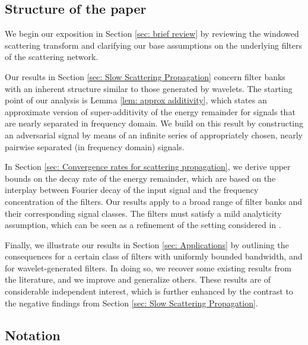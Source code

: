 \documentclass[11pt]{amsart}
\newenvironment{proof sketch} {\textit{Proof sketch.}}{}
\begin{document}
  
  \subsection{Structure of the paper}
  
  We begin our exposition in Section \ref{sec: brief review} by reviewing the windowed scattering transform and clarifying our base assumptions on the underlying filters of the scattering network. 
  
  Our results in Section \ref{sec: Slow Scattering Propagation} concern filter banks with an inherent structure similar to those generated by wavelets. The starting point of our analysis is Lemma \ref{lem: approx additivity}, which states an approximate version of super-additivity of the energy remainder for signals that are nearly separated in frequency domain. We build on this result by constructing an adversarial signal by means of an infinite series of appropriately chosen, nearly pairwise separated (in frequency domain) signals.
  
  In Section \ref{sec: Convergence rates for scattering propagation}, we derive upper bounds on the decay rate of the energy remainder, which are based on the interplay between Fourier decay of the input signal and the frequency concentration of the filters. Our results apply to a broad range of filter banks and their corresponding signal classes. The filters must satisfy a mild analyticity assumption, which can be seen as a refinement of the setting considered in \cite[Assumption 1]{wiatowski2017energy}. 
  
  Finally, we illustrate our results in Section \ref{sec: Applications} by outlining the consequences for a certain class of filters with uniformly bounded bandwidth, and for wavelet-generated filters. In doing so, we recover some existing results from the literature, and we improve and generalize others. These results are of considerable independent interest, which is further enhanced by the contrast to the negative findings from Section \ref{sec: Slow Scattering Propagation}.
  
  \subsection{Notation}\label{sec: Notation}
  
\end{document}
